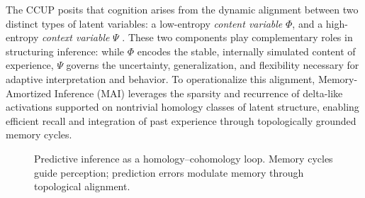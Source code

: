 \documentclass[lettersize,journal]{IEEEtran}
\begin{document}
The CCUP posits that cognition arises from the dynamic alignment between two distinct types of latent variables: a low-entropy \emph{content variable} \( \Phi \), and a high-entropy \emph{context variable} \( \Psi \) \cite{li2025CCUP}. These two components play complementary roles in structuring inference: while \( \Phi \) encodes the stable, internally simulated content of experience, \( \Psi \) governs the uncertainty, generalization, and flexibility necessary for adaptive interpretation and behavior. To operationalize this alignment, Memory-Amortized Inference (MAI) leverages the sparsity and recurrence of delta-like activations supported on nontrivial homology classes of latent structure, enabling efficient recall and integration of past experience through topologically grounded memory cycles.

\begin{figure}[h]
\centering
{}
\caption{Predictive inference as a homology–cohomology loop. Memory cycles guide perception; prediction errors modulate memory through topological alignment.}
\end{figure}
\end{document}
